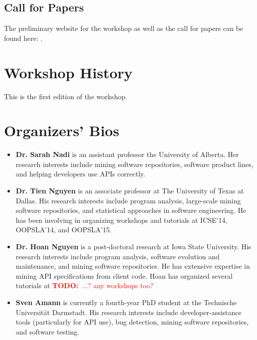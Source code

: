 \documentclass[10pt, conference]{IEEEtran}
\newcommand{\todo}[1]{{\textcolor{red}{\textbf{TODO:}~#1}}}
\begin{document}
\subsection{Call for Papers}
The preliminary website for the workshop as well as the call for papers can be found here: \url{}.

\section{Workshop History}

This is the first edition of the workshop.

\section{Organizers' Bios}
\begin{itemize}
\item \textbf{Dr. Sarah Nadi} is an assistant professor the University of Alberta. Her research interests include mining software repositories, software product lines, and helping developers use APIs correctly.

\item \textbf{Dr. Tien Nguyen} is an associate professor at The University of Texas at Dallas. His research interests include program analysis, large-scale mining software repositories, and statistical approaches in software engineering. He has been involving in organizing workshops and tutorials at ICSE’14, OOPSLA’14, and OOPSLA’15.

\item \textbf{Dr. Hoan Nguyen} is a post-doctoral research at Iowa State University. His research interests include program analysis, software evolution and maintenance, and mining software repositories. He has extensive expertise in mining API specifications from client code. Hoan has organized several tutorials at \todo{...? any workshops too?}

\item \textbf{Sven Amann} is currently a fourth-year PhD student at the Technische Universit\"{a}t Darmstadt. His research interests include developer-assistance tools (particularly for API use), bug detection, mining software repositories, and software testing.
\end{itemize}



\end{document}
